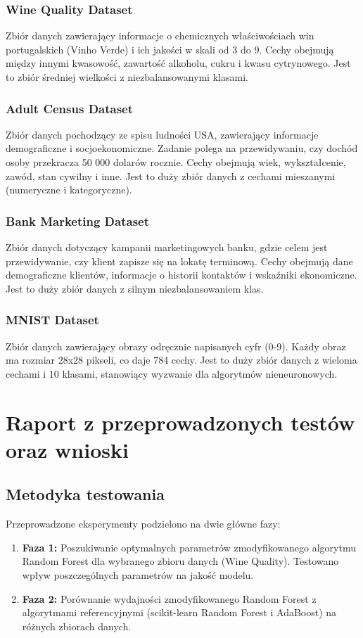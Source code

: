 \documentclass[11pt,a4paper]{article}
\begin{document}
\subsubsection{Wine Quality Dataset}
Zbiór danych zawierający informacje o chemicznych właściwościach win portugalskich (Vinho Verde) i ich jakości w skali od 3 do 9. Cechy obejmują między innymi kwasowość, zawartość alkoholu, cukru i kwasu cytrynowego. Jest to zbiór średniej wielkości z niezbalansowanymi klasami.

\subsubsection{Adult Census Dataset}
Zbiór danych pochodzący ze spisu ludności USA, zawierający informacje demograficzne i socjoekonomiczne. Zadanie polega na przewidywaniu, czy dochód osoby przekracza 50 000 dolarów rocznie. Cechy obejmują wiek, wykształcenie, zawód, stan cywilny i inne. Jest to duży zbiór danych z cechami mieszanymi (numeryczne i kategoryczne).

\subsubsection{Bank Marketing Dataset}
Zbiór danych dotyczący kampanii marketingowych banku, gdzie celem jest przewidywanie, czy klient zapisze się na lokatę terminową. Cechy obejmują dane demograficzne klientów, informacje o historii kontaktów i wskaźniki ekonomiczne. Jest to duży zbiór danych z silnym niezbalansowaniem klas.

\subsubsection{MNIST Dataset}
Zbiór danych zawierający obrazy odręcznie napisanych cyfr (0-9). Każdy obraz ma rozmiar 28x28 pikseli, co daje 784 cechy. Jest to duży zbiór danych z wieloma cechami i 10 klasami, stanowiący wyzwanie dla algorytmów nieneuronowych.

\section{Raport z przeprowadzonych testów oraz wnioski}

\subsection{Metodyka testowania}

Przeprowadzone eksperymenty podzielono na dwie główne fazy:
\begin{enumerate}
    \item \textbf{Faza 1:} Poszukiwanie optymalnych parametrów zmodyfikowanego algorytmu Random Forest dla wybranego zbioru danych (Wine Quality). Testowano wpływ poszczególnych parametrów na jakość modelu.

    \item \textbf{Faza 2:} Porównanie wydajności zmodyfikowanego Random Forest z algorytmami referencyjnymi (scikit-learn Random Forest i AdaBoost) na różnych zbiorach danych.
\end{enumerate}
\end{document}
